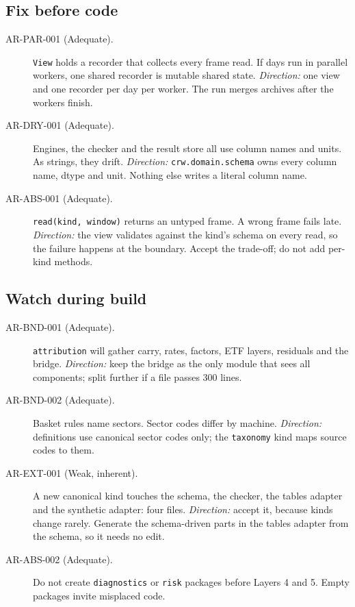 \documentclass[11pt,a4paper]{article}
\newcommand{\code}[1]{\texttt{\small #1}}
\begin{document}
\subsection*{Fix before code}
\begin{description}
\item[AR-PAR-001 (Adequate).] \code{View} holds a recorder that collects every frame read. If days run in parallel workers, one shared recorder is mutable shared state. \emph{Direction:} one view and one recorder per day per worker. The run merges archives after the workers finish.
\item[AR-DRY-001 (Adequate).] Engines, the checker and the result store all use column names and units. As strings, they drift. \emph{Direction:} \code{crw.domain.schema} owns every column name, dtype and unit. Nothing else writes a literal column name.
\item[AR-ABS-001 (Adequate).] \code{read(kind, window)} returns an untyped frame. A wrong frame fails late. \emph{Direction:} the view validates against the kind's schema on every read, so the failure happens at the boundary. Accept the trade-off; do not add per-kind methods.
\end{description}

\subsection*{Watch during build}
\begin{description}
\item[AR-BND-001 (Adequate).] \code{attribution} will gather carry, rates, factors, ETF layers, residuals and the bridge. \emph{Direction:} keep the bridge as the only module that sees all components; split further if a file passes 300 lines.
\item[AR-BND-002 (Adequate).] Basket rules name sectors. Sector codes differ by machine. \emph{Direction:} definitions use canonical sector codes only; the \code{taxonomy} kind maps source codes to them.
\item[AR-EXT-001 (Weak, inherent).] A new canonical kind touches the schema, the checker, the tables adapter and the synthetic adapter: four files. \emph{Direction:} accept it, because kinds change rarely. Generate the schema-driven parts in the tables adapter from the schema, so it needs no edit.
\item[AR-ABS-002 (Adequate).] Do not create \code{diagnostics} or \code{risk} packages before Layers 4 and 5. Empty packages invite misplaced code.
\end{description}
\end{document}
